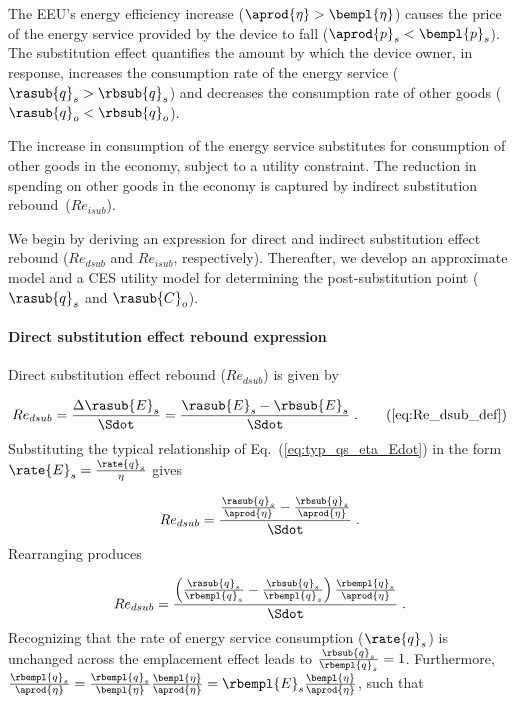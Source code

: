 The EEU's energy efficiency increase
($\aprod{\eta} > \bempl{\eta}$)
causes the price of the energy service provided by the device to fall
($\aprod{p}_s < \bempl{p}_s$).
The substitution effect quantifies the amount by which
the device owner, in response,
increases the consumption rate of the energy service ($\rasub{q}_s > \rbsub{q}_s$) and
decreases the consumption rate of other goods ($\rasub{q}_o < \rbsub{q}_o$).

The increase in consumption of the energy service 
substitutes for consumption of other goods in the economy,
subject to a utility constraint.
The reduction in spending on other goods in the economy
is captured by indirect substitution rebound~($Re_{isub}$).

We begin by deriving an expression for direct and indirect 
substitution effect rebound ($Re_{dsub}$ and $Re_{isub}$, respectively).
Thereafter, we develop an approximate model and a CES utility model for determining the 
post-substitution point ($\rasub{q}_s$ and $\rasub{C}_o$).


\paragraph{Direct substitution effect rebound expression}
\label{sec:Redsub_expression}

Direct substitution effect rebound ($Re_{dsub}$) is given by

\begin{equation}
  Re_{dsub} = \frac{\Delta \rasub{E}_s}{\Sdot} = \frac{\rasub{E}_s - \rbsub{E}_s}{\Sdot} \; . \tag{\ref{eq:Re_dsub_def}}
\end{equation}
%
Substituting the typical relationship of Eq.~(\ref{eq:typ_qs_eta_Edot})
in the form $\rate{E}_s = \frac{\rate{q}_s}{\eta}$ gives

\begin{equation}
  Re_{dsub} = \frac{\frac{\rasub{q}_s}{\aprod{\eta}} - \frac{\rbsub{q}_s}{\aprod{\eta}}}{\Sdot} \; .
\end{equation}
%
Rearranging produces

\begin{equation}
  Re_{dsub} = \frac{ \left( \frac{\rasub{q}_s}{\rbempl{q}_s}
                    - \frac{\rbsub{q}_s}{\rbempl{q}_s}  \right) \frac{\rbempl{q}_s}{\aprod{\eta}} }{\Sdot} \; .
\end{equation}
%
Recognizing that the rate of energy service consumption ($\rate{q}_s$)
is unchanged across the emplacement effect leads to $\frac{\rbsub{q}_s}{\rbempl{q}_s} = 1$.
Furthermore, $\frac{\rbempl{q}_s}{\aprod{\eta}}
            = \frac{\rbempl{q}_s}{\bempl{\eta}} \frac{\bempl{\eta}}{\aprod{\eta}}
            = \rbempl{E}_s \frac{\bempl{\eta}}{\aprod{\eta}}$,
such that


